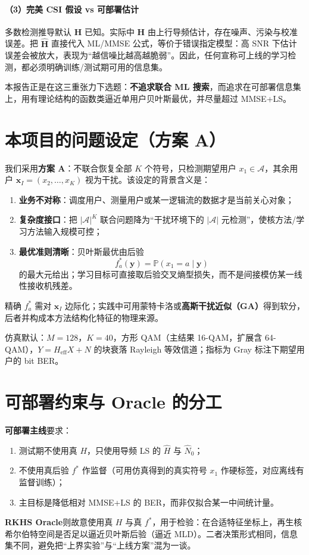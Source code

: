 \paragraph{（3）完美 CSI 假设 vs 可部署估计}
多数检测推导默认 $\mathbf{H}$ 已知。实际中 $\mathbf{H}$ 由上行导频估计，存在噪声、污染与校准误差\cite{bjornson2017}。把 $\hat{\mathbf{H}}$ 直接代入 ML/MMSE 公式，等价于错误指定模型：高 SNR 下估计误差会被放大，表现为“越信噪比越高越脆弱”。因此，任何宣称可上线的学习检测，都必须明确训练/测试期可用的信息集。

本报告正是在这三重张力下选题：\textbf{不追求联合 ML 搜索}，而追求在可部署信息集上，用有理论结构的函数类逼近单用户贝叶斯最优，并尽量超过 MMSE+LS。

\section{本项目的问题设定（方案 A）}

我们采用\textbf{方案 A}：不联合恢复全部 $K$ 个符号，只检测期望用户 $x_1\in\mathcal{A}$，其余用户 $\mathbf{x}_I=(x_2,\ldots,x_K)$ 视为干扰。该设定的背景含义是：
\begin{enumerate}[leftmargin=2em]
  \item \textbf{业务不对称}：调度用户、测量用户或某一逻辑流的数据才是当前关心对象；
  \item \textbf{复杂度接口}：把 $|\mathcal{A}|^K$ 联合问题降为“干扰环境下的 $|\mathcal{A}|$ 元检测”，使核方法/学习方法输入规模可控；
  \item \textbf{最优准则清晰}：贝叶斯最优由后验
  \[
  f_a^*(\mathbf{y})=\mathbb{P}(x_1=a\mid\mathbf{y})
  \]
  的最大元给出；学习目标可直接取后验交叉熵型损失，而不是间接模仿某一线性接收机残差。
\end{enumerate}
精确 $f_a^*$ 需对 $\mathbf{x}_I$ 边际化；实践中可用蒙特卡洛或\textbf{高斯干扰近似（GA）}得到软分，后者并构成本方法结构化特征的物理来源。

仿真默认：$M=128$，$K=40$，方形 QAM（主结果 16-QAM，扩展含 64-QAM），$Y=H_{\mathrm{eff}}X+N$ 的块衰落 Rayleigh 等效信道；指标为 Gray 标注下期望用户的 bit BER。

\section{可部署约束与 Oracle 的分工}

\textbf{可部署主线}要求：
\begin{enumerate}[leftmargin=2em]
  \item 测试期不使用真 $H$，只使用导频 LS 的 $\hat H$ 与 $\hat N_0$；
  \item 不使用真后验 $f^*$ 作监督（可用仿真得到的真实符号 $x_1$ 作硬标签，对应离线有监督训练）；
  \item 主目标是降低相对 MMSE+LS 的 BER，而非仅拟合某一中间统计量。
\end{enumerate}
\textbf{RKHS Oracle}则故意使用真 $H$ 与真 $f^*$，用于检验：在合适特征坐标上，再生核希尔伯特空间是否足以逼近贝叶斯后验（逼近 MLD）。二者决策形式相同，信息集不同，避免把“上界实验”与“上线方案”混为一谈。

